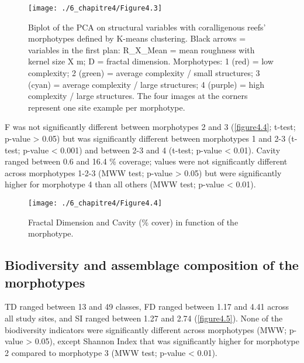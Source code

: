 \begin{figure}[H]
	\begin{center}
	\texttt{[image: ./6\_chapitre4/Figure4.3]}
		\caption[Biplot of the PCA on structural variables with coralligenous reefs’ morphotypes defined by K-means clustering]{Biplot of the PCA on structural variables with coralligenous reefs’ morphotypes defined by K-means clustering. Black arrows = variables in the first plan: R\_X\_Mean = mean roughness with kernel size X m; D = fractal dimension. Morphotypes: 1 (red) = low complexity; 2 (green) = average complexity / small structures; 3 (cyan) = average complexity / large structures; 4 (purple) = high complexity / large structures. The four images at the corners represent one site example per morphotype.}
	\label{figure4.3}
\end{center}
\end{figure}

F was not significantly different between morphotypes 2 and 3 (\autoref{figure4.4}; t-test; p-value > 0.05) but was significantly different between morphotypes 1 and 2-3 (t-test; p-value < 0.001) and between 2-3 and 4 (t-test; p-value < 0.01). Cavity ranged between 0.6 and 16.4 \% coverage; values were not significantly different across morphotypes 1-2-3 (MWW test; p-value > 0.05) but were significantly higher for morphotype 4 than all others (MWW test; p-value < 0.01).

\begin{figure}[H]
	\begin{center}
	\texttt{[image: ./6\_chapitre4/Figure4.4]}
		\caption[Fractal Dimension and Cavity (\% cover) in function of the morphotype]{Fractal Dimension and Cavity (\% cover) in function of the morphotype.}
	\label{figure4.4}
\end{center}
\end{figure}


\subsection[Biodiversity and assemblage composition of the morphotypes]{Biodiversity and assemblage composition of the morphotypes}\label{chapitre4_3.2}
TD ranged between 13 and 49 classes, FD ranged between 1.17 and 4.41 across all study sites, and SI ranged between 1.27 and 2.74 (\autoref{figure4.5}). None of the biodiversity indicators were significantly different across morphotypes (MWW; p-value > 0.05), except Shannon Index that was significantly higher for morphotype 2 compared to morphotype 3 (MWW test; p-value < 0.01). 

